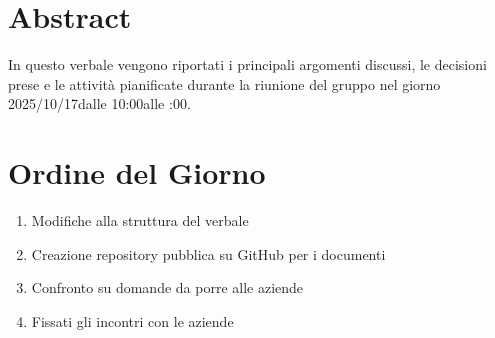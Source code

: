 \documentclass[a4paper,12pt]{article}
\newcommand{\DataVerbale}{2025/10/17}
\newcommand{\OraInizio}{10:00}
\newcommand{\OraFine}{12:00}
\newcommand{\AbstractVerbale}{%
In questo verbale vengono riportati i principali argomenti discussi, le decisioni prese e le attività pianificate durante la riunione del gruppo nel giorno \DataVerbale \space dalle \OraInizio \space alle \space \OraFine .
}
\begin{document}
\newpage

\tableofcontents

\newpage
\section{Abstract}{
    \begin{minipage}{0.9\textwidth}
        \small
        \AbstractVerbale
    \end{minipage}
}


\section{Ordine del Giorno}{
    \begin{enumerate}
        \item Modifiche alla struttura del verbale
        \item Creazione repository pubblica su GitHub per i documenti
        \item Confronto su domande da porre alle aziende
        \item Fissati gli incontri con le aziende
    \end{enumerate}
}
\end{document}
